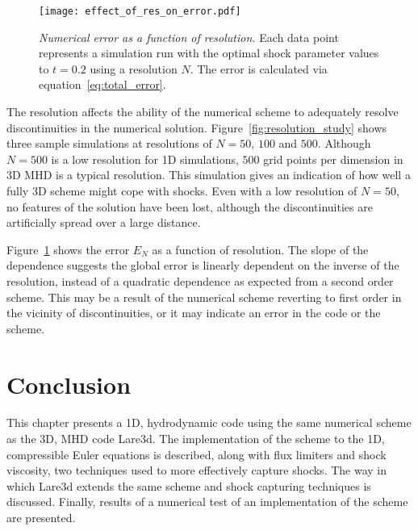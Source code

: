 \begin{figure}[t]
  \centering
  \texttt{[image: effect\_of\_res\_on\_error.pdf]}
  \caption{\emph{Numerical error as a function of resolution.} Each data point represents a simulation run with the optimal shock parameter values to $t=0.2$ using a resolution $N$. The error is calculated via equation~\eqref{eq:total_error}.}%
  \label{fig:effect_of_res_on_error}
\end{figure}

The resolution affects the ability of the numerical scheme to adequately resolve discontinuities in the numerical solution. Figure~\ref{fig:resolution_study} shows three sample simulations at resolutions of $N=50$, $100$ and $500$. Although $N=500$ is a low resolution for 1D simulations, $500$ grid points per dimension in 3D MHD is a typical resolution. This simulation gives an indication of how well a fully 3D scheme might cope with shocks. Even with a low resolution of $N=50$, no features of the solution have been lost, although the discontinuities are artificially spread over a large distance.

Figure~\ref{fig:effect_of_res_on_error} shows the error $E_N$ as a function of resolution. The slope of the dependence suggests the global error is linearly dependent on the inverse of the resolution, instead of a quadratic dependence as expected from a second order scheme. This may be a result of the numerical scheme reverting to first order in the vicinity of discontinuities, or it may indicate an error in the code or the scheme. 

\section{Conclusion}

This chapter presents a 1D, hydrodynamic code using the same numerical scheme as the 3D, MHD code Lare3d. The implementation of the scheme to the 1D, compressible Euler equations is described, along with flux limiters and shock viscosity, two techniques used to more effectively capture shocks. The way in which Lare3d extends the same scheme and shock capturing techniques is discussed. Finally, results of a numerical test of an implementation of the scheme are presented.
